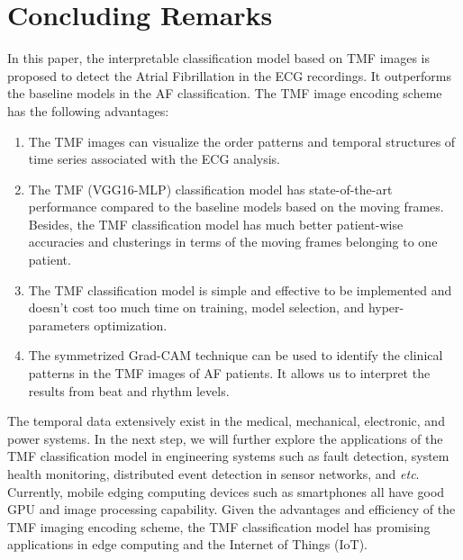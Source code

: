 \documentclass[journal]{IEEEtran}
\begin{document}
\section{Concluding Remarks}

In this paper, the interpretable classification model based on TMF images is proposed to detect the Atrial Fibrillation in the ECG recordings. 
It outperforms the baseline models in the AF classification. The TMF image encoding scheme has the following advantages:
\begin{enumerate}
  \item The TMF images can visualize the order patterns and temporal structures of time series associated with the ECG analysis.
  \item The TMF (VGG16-MLP) classification model has state-of-the-art performance compared to the baseline models based on the moving frames. Besides, the TMF classification model has much better patient-wise accuracies and clusterings in terms of the moving frames belonging to one patient.  
  \item The TMF classification model is simple and effective to be implemented and doesn't cost too much time on training, model selection, and hyper-parameters optimization.
  \item The symmetrized Grad-CAM technique can be used to identify the clinical patterns in the TMF images of AF patients. It allows us to interpret the results from beat and rhythm levels. 
\end{enumerate}
The temporal data extensively exist in the medical, mechanical, electronic, and power systems. In the next step, we will further explore the applications of the TMF classification model in engineering systems such as fault detection, system health monitoring, distributed event detection in sensor networks, and {\it{etc}}. Currently, mobile edging computing devices such as smartphones all have good GPU and image processing capability. Given the advantages and efficiency of the TMF imaging encoding scheme, the TMF classification model has promising applications in edge computing and the Internet of Things (IoT). 





\end{document}

